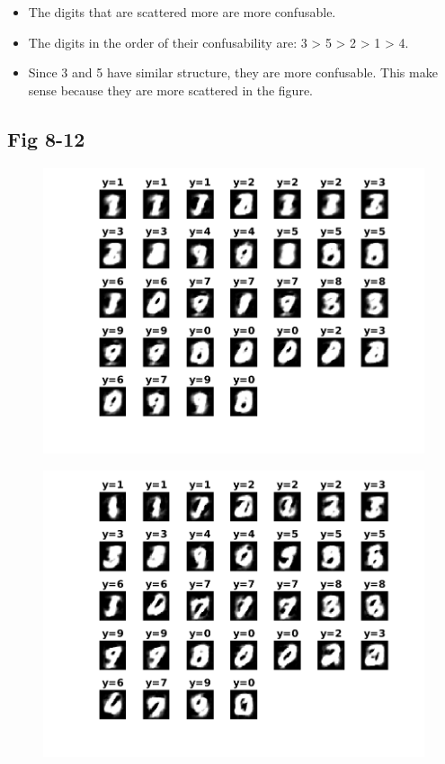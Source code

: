 \documentclass{article}
\begin{document}
\begin{itemize}
\item The digits that are scattered more are more confusable.
\item The digits in the order of their confusability are: 3 > 5 > 2 > 1 > 4.
\item Since 3 and 5 have similar structure, they are more confusable. This make sense because they are more scattered in the figure. 
\end{itemize}

\subsection{Fig 8-12}
\begin{figure}[h!]
\begin{multicols}{3}
\includegraphics[width=1\columnwidth]{RunResults2/8.png}
\label{8}

\includegraphics[width=1\columnwidth]{RunResults2/9.png}
\label{9}


\end{multicols}
\end{figure}
\end{document}
